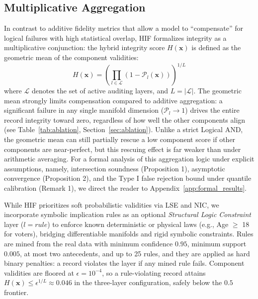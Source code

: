 \documentclass[pdflatex,sn-mathphys-num]{sn-jnl}
\theoremstyle{thmstyleone}%
\theoremstyle{thmstyletwo}%
\theoremstyle{thmstylethree}%
\begin{document}
\subsection{Multiplicative Aggregation}

In contrast to additive fidelity metrics that allow a model to ``compensate'' for logical failures with high statistical overlap, HIF formalizes integrity as a multiplicative conjunction: the hybrid integrity score $H(\mathbf{x})$ is defined as the geometric mean of the component validities:
\begin{equation}
    H(\mathbf{x}) = \left( \prod_{l \in \mathcal{L}} (1 - \mathcal{P}_l(\mathbf{x})) \right)^{1/L}
\end{equation}
where $\mathcal{L}$ denotes the set of active auditing layers, and $L = |\mathcal{L}|$. The geometric mean strongly limits compensation compared to additive aggregation: a significant failure in any single manifold dimension ($\mathcal{P}_l \to 1$) drives the entire record integrity toward zero, regardless of how well the other components align (see Table~\ref{tab:ablation}, Section~\ref{sec:ablation}). Unlike a strict Logical AND, the geometric mean can still partially rescue a low component score if other components are near-perfect, but this rescuing effect is far weaker than under arithmetic averaging. For a formal analysis of this aggregation logic under explicit assumptions, namely, intersection soundness (Proposition 1), asymptotic convergence (Proposition 2), and the Type I false rejection bound under quantile calibration (Remark 1), we direct the reader to Appendix~\ref{app:formal_results}.

While HIF prioritizes soft probabilistic validities via LSE and NIC, we incorporate symbolic implication rules as an optional \textit{Structural Logic Constraint} layer ($l=rule$) to enforce known deterministic or physical laws (e.g., Age $\ge$ 18 for voters), bridging differentiable manifolds and rigid symbolic constraints. Rules are mined from the real data with minimum confidence $0.95$, minimum support $0.005$, at most two antecedents, and up to 25 rules, and they are applied as hard binary penalties: a record violates the layer if any mined rule fails. Component validities are floored at $\epsilon = 10^{-4}$, so a rule-violating record attains $H(\mathbf{x}) \le \epsilon^{1/L} \approx 0.046$ in the three-layer configuration, safely below the $0.5$ frontier.
\end{document}
